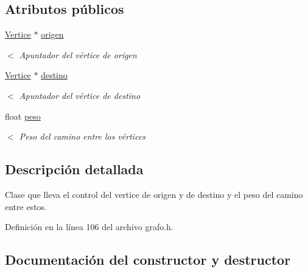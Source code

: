 \subsection*{Atributos públicos}
\begin{DoxyCompactItemize}
\item 
\mbox{\label{classArista_a9eb724ff0d46897de85b760d36a2e6b4}} 
\hyperlink{classVertice}{Vertice} $\ast$ \hyperlink{classArista_a9eb724ff0d46897de85b760d36a2e6b4}{origen}
\begin{DoxyCompactList}\small\item\em $<$ Apuntador del vértice de origen \end{DoxyCompactList}\item 
\mbox{\label{classArista_a7cc7d54b1945783a426f5251026af702}} 
\hyperlink{classVertice}{Vertice} $\ast$ \hyperlink{classArista_a7cc7d54b1945783a426f5251026af702}{destino}
\begin{DoxyCompactList}\small\item\em $<$ Apuntador del vértice de destino \end{DoxyCompactList}\item 
\mbox{\label{classArista_a371fdf684b589d3b3d842ad5ae338342}} 
float \hyperlink{classArista_a371fdf684b589d3b3d842ad5ae338342}{peso}
\begin{DoxyCompactList}\small\item\em $<$ Peso del camino entre los vértices \end{DoxyCompactList}\end{DoxyCompactItemize}


\subsection{Descripción detallada}
Clase que lleva el control del vertice de \textquotesingle{}origen\textquotesingle{} y de \textquotesingle{}destino\textquotesingle{} y el peso del camino entre estos. 

Definición en la línea 106 del archivo grafo.\+h.



\subsection{Documentación del constructor y destructor}
\mbox{\label{classArista_abfc5e334e70240f90b0f8d0cc094ad40}} 
